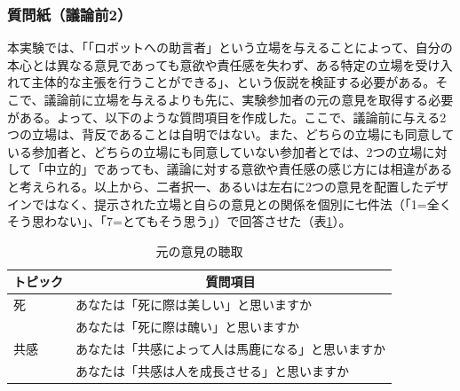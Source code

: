 \documentclass[11pt, a4paper]{jreport} %
\begin{document}
\subsubsection*{質問紙（議論前2）}
本実験では、「「ロボットへの助言者」という立場を与えることによって、自分の本心とは異なる意見であっても意欲や責任感を失わず、ある特定の立場を受け入れて主体的な主張を行うことができる」、という仮説を検証する必要がある。そこで、議論前に立場を与えるよりも先に、実験参加者の元の意見を取得する必要がある。よって、以下のような質問項目を作成した。ここで、議論前に与える2つの立場は、背反であることは自明ではない。また、どちらの立場にも同意している参加者と、どちらの立場にも同意していない参加者とでは、2つの立場に対して「中立的」であっても、議論に対する意欲や責任感の感じ方には相違があると考えられる。以上から、二者択一、あるいは左右に2つの意見を配置したデザインではなく、提示された立場と自らの意見との関係を個別に七件法（「1=全くそう思わない」、「7=とてもそう思う」）で回答させた（表\ref{tab:motonoiken}）。
\begin{table}[H]
\caption{元の意見の聴取}
\centering
\label{tab:motonoiken}
\begin{tabular}{@{}ll@{}}
\toprule
\multicolumn{1}{c}{トピック} & \multicolumn{1}{c}{質問項目}  \\ \midrule
死                        & あなたは「死に際は美しい」と思いますか       \\
                         & あなたは「死に際は醜い」と思いますか        \\
共感                       & あなたは「共感によって人は馬鹿になる」と思いますか \\
                         & あなたは「共感は人を成長させる」と思いますか    \\ \bottomrule
\end{tabular}
\end{table}

\end{document}
